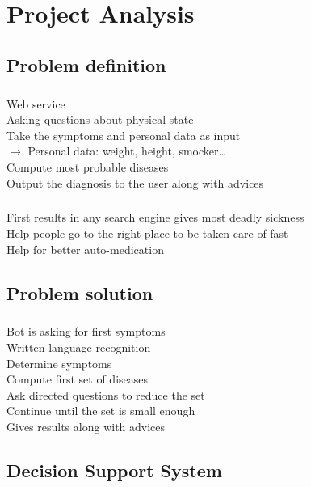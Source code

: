 \chapter{Project Analysis} %

\section{Problem definition}

\paragraph{} %
Web service \\
Asking questions about physical state \\
Take the symptoms and personal data as input \\
$\rightarrow$ Personal data: weight, height, smocker… \\
Compute most probable diseases \\
Output the diagnosis to the user along with advices 

\paragraph{} %
First results in any search engine gives most deadly sickness \\
Help people go to the right place to be taken care of fast \\
Help for better auto-medication 

\section{Problem solution}

\paragraph{}
Bot is asking for first symptoms \\
Written language recognition \\
Determine symptoms \\
Compute first set of diseases \\
Ask directed questions to reduce the set \\
Continue until the set is small enough \\
Gives results along with advices 

\section{Decision Support System}


